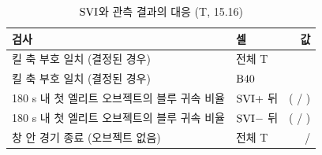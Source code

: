 \begin{table}[!t]
  \centering
  \caption{$\mathrm{SVI}$와 관측 결과의 대응 (T, 15.16)}
  \label{tab:correspondence}
  \small
  \begin{tabular}{@{}llr@{}}
    \toprule
    검사 & 셀 & 값 \\
    \midrule
    킬 축 부호 일치 (결정된 경우) & 전체 T & \killAgreeAll{} \\
    킬 축 부호 일치 (결정된 경우) & $\mathrm{B40}$ & \killAgreeBforty{} \\
    180 s 내 첫 엘리트 오브젝트의 블루 귀속 비율 & $\mathrm{SVI}+$ 뒤 & \objBluePos{} (\objBluePosNum{} / \objBluePosDen{}) \\
    180 s 내 첫 엘리트 오브젝트의 블루 귀속 비율 & $\mathrm{SVI}-$ 뒤 & \objBlueNeg{} (\objBlueNegNum{} / \objBlueNegDen{}) \\
    창 안 경기 종료 (오브젝트 없음) & 전체 T & \objGameEnded{} / \numTTest{} \\
    \bottomrule
  \end{tabular}
\end{table}
